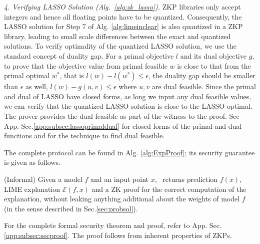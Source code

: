 \textit{4. Verifying LASSO Solution (Alg.~\ref{alg:zk_lasso}).} ZKP libraries only accept integers and hence all floating points have to be quantized. Consequently, the LASSO solution for Step 7 of Alg. \ref{alg:limeinclear} is also quantized in a ZKP library, leading to small scale differences between the exact and quantized solutions. To verify optimality of the quantized LASSO solution, we use the standard concept of duality gap. For a primal objective $l$ and its dual objective $g$, to prove that the objective value from primal feasible $w$ is close to that from the primal optimal $w^*$, that is $l(w) - l(w^*) \leq \epsilon$, the duality gap should be smaller than $\epsilon$ as well, $l(w) - g(u,v) \leq \epsilon$ where $u,v$ are dual feasible. Since the primal and dual of LASSO have closed forms, as long we input any dual feasible values, we can verify that the quantized LASSO solution is close to the LASSO optimal. The prover provides the dual feasible as part of the witness to the proof. See App. Sec.\ref{app:subsec:lassoprimaldual} for closed forms of the primal and dual functions and for the technique to find dual feasible.


The complete \name protocol can be found in Alg. \ref{alg:ExpProof}; its security guarantee is given as follows.

\begin{theorem}
(Informal) Given a model $f$ and an input point $x$, \name~returns prediction $f(x)$, LIME explanation $\mathcal{E}(f, x)$ and a ZK proof for the correct computation of the explanation, without leaking anything additional about the weights of model $f$ (in the sense described in Sec.\ref{sec:probsol}).
\end{theorem}

For the complete formal security theorem and proof, refer to App. Sec. \ref{app:subsec:secproof}. The proof follows from inherent properties of ZKPs.




